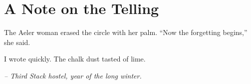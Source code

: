 \chapter*{A Note on the Telling}

The Aeler woman erased the circle with her palm. “Now the forgetting begins,” she said.

I wrote quickly. The chalk dust tasted of lime.

\smallskip

\noindent \textit{– Third Stack hostel, year of the long winter.}

